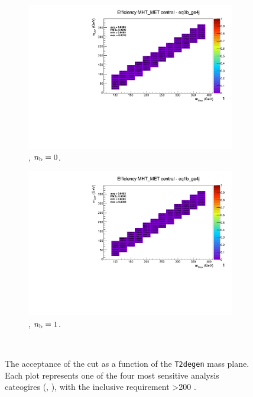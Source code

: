 \begin{figure}[h!]
\begin{subfigure}[b]{0.4\textwidth}
    \includegraphics[width=\textwidth, page=5]{Figs/sms/t2degen/v19/systs/T2_4body_MHT_MET_eq0b_ge4j.pdf}
    \caption{\njhigh, $n_{\text{b}} = 0$.}
  \end{subfigure}
  \begin{subfigure}[b]{0.4\textwidth}
    \includegraphics[width=\textwidth, page=5]{Figs/sms/t2degen/v19/systs/T2_4body_MHT_MET_eq1b_ge4j.pdf}
    \caption{\njhigh, $n_{\text{b}} = 1$.}
  \end{subfigure}\\
  \caption{The acceptance of the \mhtmet cut as a function of the \texttt{T2degen}
  mass plane. Each plot represents one of the four most sensitive 
  analysis cateogires (\nb, \nj), with the inclusive requirement \HT>200 \gev.}
  \label{fig:sms-mhtmet-t2degen}
\end{figure}


